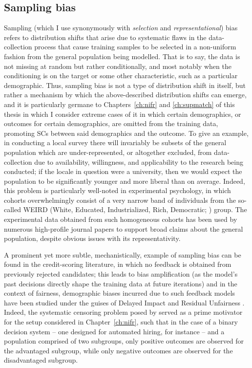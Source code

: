 \subsection{Sampling bias}\label{ssec:sampling-bias}
Sampling (which I use synonymously with \emph{selection} and \emph{representational}) bias refers
to distribution shifts that arise due to systematic flaws in the data-collection process that cause
training samples to be selected in a non-uniform fashion from the general population being
modelled.
%
That is to say, the data is not missing at random but rather conditionally, and most notably when
the conditioning is on the target or some other characteristic, such as a particular demographic.
%
Thus, sampling bias is not a type of distribution shift in itself, but rather a mechanism by which
the above-described distribution shifts can emerge, and it is particularly germane to
Chapters~\ref{ch:nifr} and \ref{ch:supmatch} of this thesis in which I consider extreme cases of it
in which certain demographics, or outcomes for certain demographics, are omitted from the training
data, promoting \acp{SC} between said demographics and the outcome.
%
To give an example, in conducting a local survey there will invariably be subsets of the general
population which are under-represented, or altogether excluded, from data-collection due to
availability, willingness, and applicability to the research being conducted; if the locale in
question were a university, then we would expect the population to be significantly younger and
more liberal than on average.
%
Indeed, this problem is particularly well-noted in experimental psychology, in which cohorts
overwhelmingly consist of a very narrow band of individuals from the so-called WEIRD (White,
Educated, Industrialized, Rich, Democratic; \citet{henrich2010weirdest}) group.
%
The experimental data obtained from such homogeneous cohorts has been used by numerous high-profile
journal papers to support broad claims about the general population, despite obvious issues with
its representativity.

%
A prominent yet more subtle, mechanistically, example of sampling bias can be found in the
credit-scoring literature, in which no feedback is obtained from previously rejected candidates;
this leads to bias amplification (as the model's past decisions directly shape the training data at
future iterations) and in the context of fairness, demographic biases incurred due to such feedback
models have been studied under the guises of Delayed Impact \citep{liu2018delayed} and Residual
Unfairness \citep{kallus2018residual}.
%
Indeed, the systematic censoring problem posed by \citet{kallus2018residual} served as a prime
motivator for the setup considered in Chapter~\ref{ch:nifr}, such that in the case of a binary
decision system -- one designed for automated hiring, for instance -- and a population comprised of
two subgroups, only positive outcomes are observed for the advantaged subgroup, while only negative
outcomes are observed for the disadvantaged subgroup.
%
